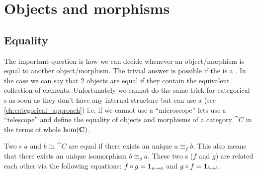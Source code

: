 \chapter{Objects and morphisms}

\section{Equality}

The important question is how we can decide whenever an
object/morphism is equal to another object/morphism. The trivial
answer is possible if the  is a
. In the case we can say that 2 objects are equal
if they contain the equivalent collection of elements. Unfortunately
we cannot do the same trick for categorical s as
soon as they don't have any internal 
structure but can use a  (see \cref{ch:categorical_approach}) i.e. if we cannot use a ``microscope'' lets
use a ``telescope'' and define the equality of objects and morphisms of
a category $\cat{C}$ in the terms of whole $\mathrm{hom}(\mathbf{C})$.

\begin{definition}
\label{def:object_equality}
Two s $a$ and $b$ in 
$\cat{C}$ are equal if there exists an unique
 $a \cong_f b$. This also means that
there exists an unique isomorphism $b \cong_g a$. These two
s ($f$ and $g$) are related each other via 
the following equations: $f \circ g = \mathbf{1}_{ a \to a }$ and $g \circ f
= \mathbf{1}_{ b \to b }$. 
\end{definition}

